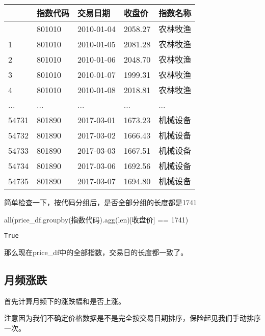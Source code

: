 \documentclass[
  letterpaper,
  DIV=11,
  numbers=noendperiod]{scrreprt}
\newenvironment{Shaded}{\begin{snugshade}}{\end{snugshade}}
\newcommand{\BuiltInTok}[1]{\textcolor[rgb]{0.00,0.23,0.31}{#1}}
\newcommand{\DecValTok}[1]{\textcolor[rgb]{0.68,0.00,0.00}{#1}}
\newcommand{\NormalTok}[1]{\textcolor[rgb]{0.00,0.23,0.31}{#1}}
\newcommand{\OperatorTok}[1]{\textcolor[rgb]{0.37,0.37,0.37}{#1}}
\newcommand{\StringTok}[1]{\textcolor[rgb]{0.13,0.47,0.30}{#1}}
\begin{document}
\begin{longtable}[]{@{}lllll@{}}
\toprule\noalign{}
& 指数代码 & 交易日期 & 收盘价 & 指数名称 \\
\midrule\noalign{}
\endhead
\bottomrule\noalign{}
\endlastfoot
0 & 801010 & 2010-01-04 & 2058.27 & 农林牧渔 \\
1 & 801010 & 2010-01-05 & 2081.28 & 农林牧渔 \\
2 & 801010 & 2010-01-06 & 2048.70 & 农林牧渔 \\
3 & 801010 & 2010-01-07 & 1999.31 & 农林牧渔 \\
4 & 801010 & 2010-01-08 & 2018.81 & 农林牧渔 \\
... & ... & ... & ... & ... \\
54731 & 801890 & 2017-03-01 & 1673.23 & 机械设备 \\
54732 & 801890 & 2017-03-02 & 1666.43 & 机械设备 \\
54733 & 801890 & 2017-03-03 & 1667.51 & 机械设备 \\
54734 & 801890 & 2017-03-06 & 1692.56 & 机械设备 \\
54735 & 801890 & 2017-03-07 & 1694.80 & 机械设备 \\
\end{longtable}

简单检查一下，按代码分组后，是否全部分组的长度都是1741

\begin{Shaded}
\begin{Highlighting}[]
\BuiltInTok{all}\NormalTok{(price\_df.groupby(}\StringTok{\textquotesingle{}指数代码\textquotesingle{}}\NormalTok{).agg(}\BuiltInTok{len}\NormalTok{)[}\StringTok{\textquotesingle{}收盘价\textquotesingle{}}\NormalTok{] }\OperatorTok{==} \DecValTok{1741}\NormalTok{)}
\end{Highlighting}
\end{Shaded}

\begin{verbatim}
True
\end{verbatim}

那么现在price\_df中的全部指数，交易日的长度都一致了。

\hypertarget{ux6708ux9891ux6da8ux8dcc}{%
\subsection{月频涨跌}\label{ux6708ux9891ux6da8ux8dcc}}

首先计算月频下的涨跌幅和是否上涨。

注意因为我们不确定价格数据是不是完全按交易日期排序，保险起见我们手动排序一次。
\end{document}
